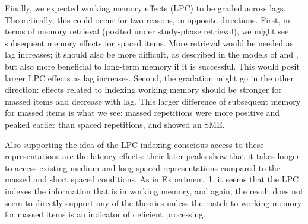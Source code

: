 Finally, we expected working memory effects (LPC) to be graded across lags.  Theoretically, this could occur for two reasons, in opposite directions.  First, in terms of memory retrieval (posited under study-phase retrieval), we might see subsequent memory effects for spaced items.  More retrieval would be needed as lag increases; it should also be more difficult, as described in the models of  and , but also more beneficial to long-term memory if it is successful.  This would posit larger LPC effects as lag increases.
Second, the gradation might go in the other direction: effects related to indexing working memory should be stronger for massed items and decrease with lag.  This larger difference of subsequent memory for massed items is what we see: massed repetitions were more positive and peaked earlier than spaced repetitions, and showed an SME.

Also supporting the idea of the LPC indexing conscious access to these representations are the latency effects: their later peaks show that it takes longer to access existing medium and long spaced representations compared to the massed and short spaced conditions.
As in Experiment~1, it seems that the LPC indexes the information that is in working memory, and again, the result does not seem to directly support any of the theories unless the match to working memory for massed items is an indicator of deficient processing.



